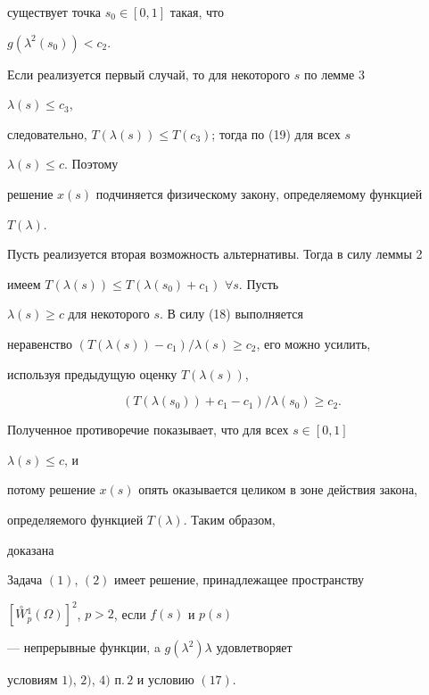 существует точка $s_0\in[0,1]$ такая, что 


$g(\lambda^2(s_0))<c_2$. 


 


Если реализуется первый случай, то для некоторого $s$ по лемме 3\;


$\lambda(s)\le c_3$, 


следовательно, $T(\lambda(s))\le T(c_3)$; тогда по (19) для всех $s$\; 


$\lambda(s)\le c$. Поэтому 


решение $x(s)$ подчиняется физическому закону, определяемому функцией 


$T(\lambda)$. 


 


Пусть реализуется вторая возможность альтернативы. Тогда в силу леммы 2 


имеем $T(\lambda(s))\le T(\lambda(s_0)+c_1)$ $\forall s$. Пусть 


$\lambda(s)\ge c$ для некоторого $s$. В силу (18) выполняется 


неравенство $(T(\lambda(s))-c_1)/\lambda(s)\ge c_2$, его можно усилить, 


используя предыдущую оценку $T(\lambda(s))$,


$$ 


(T(\lambda(s_0))+c_1-c_1)/\lambda(s_0)\ge c_2. 


$$ 


 


Полученное противоречие показывает, что для всех $s\in[0,1]$\; 


$\lambda(s)\le c$, и 


потому решение $x(s)$ опять оказывается целиком в зоне действия закона, 


определяемого функцией $T(\lambda)$. Таким образом, 


доказана 


 


\begin{thm} 


Задача $(1)$, $(2)$ имеет решение, принадлежащее пространству 


$[\overset{\circ}{W}{}^1_p(\Omega)]^2$, $p>2$, если $f(s)$ и $p(s)$ 


--- непрерывные функции, a $g(\lambda^2)\lambda$ удовлетворяет


условиям $1)$, $2)$, $4)$ п.\,$2$ и условию $(17)$. 


\end{thm} 


